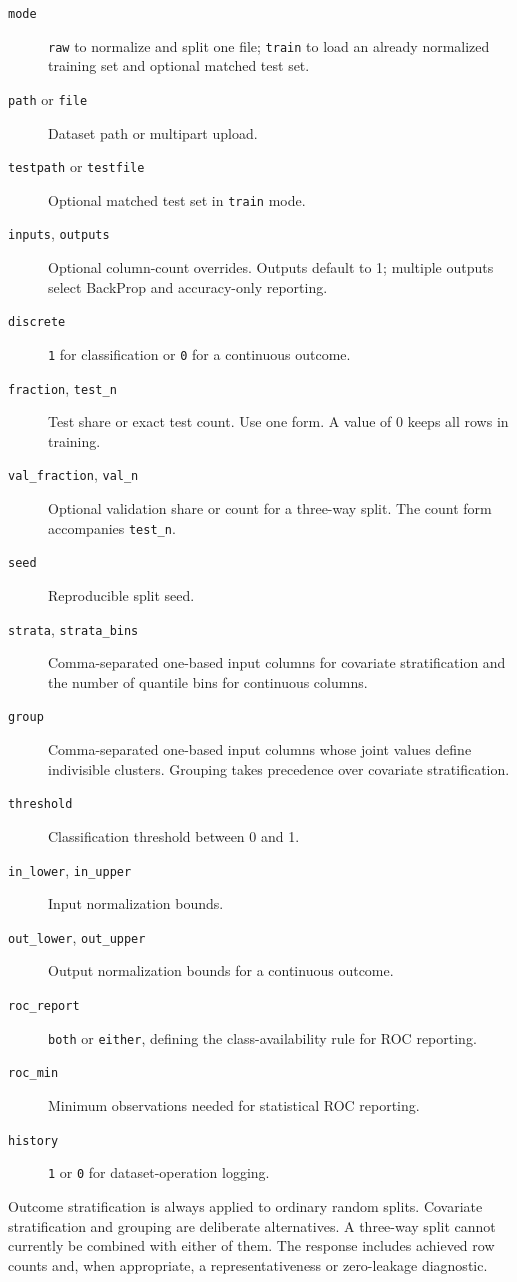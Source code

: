 \begin{description}
\item[\texttt{mode}] \texttt{raw} to normalize and split one file;
\texttt{train} to load an already normalized training set and optional
matched test set.
\item[\texttt{path} or \texttt{file}] Dataset path or multipart upload.
\item[\texttt{testpath} or \texttt{testfile}] Optional matched test set
in \texttt{train} mode.
\item[\texttt{inputs}, \texttt{outputs}] Optional column-count
overrides.  Outputs default to 1; multiple outputs select BackProp and
accuracy-only reporting.
\item[\texttt{discrete}] \texttt{1} for classification or \texttt{0}
for a continuous outcome.
\item[\texttt{fraction}, \texttt{test\_n}] Test share or exact test
count.  Use one form.  A value of 0 keeps all rows in training.
\item[\texttt{val\_fraction}, \texttt{val\_n}] Optional validation
share or count for a three-way split.  The count form accompanies
\texttt{test\_n}.
\item[\texttt{seed}] Reproducible split seed.
\item[\texttt{strata}, \texttt{strata\_bins}] Comma-separated
one-based input columns for covariate stratification and the number of
quantile bins for continuous columns.
\item[\texttt{group}] Comma-separated one-based input columns whose
joint values define indivisible clusters.  Grouping takes precedence
over covariate stratification.
\item[\texttt{threshold}] Classification threshold between 0 and 1.
\item[\texttt{in\_lower}, \texttt{in\_upper}] Input normalization
bounds.
\item[\texttt{out\_lower}, \texttt{out\_upper}] Output normalization
bounds for a continuous outcome.
\item[\texttt{roc\_report}] \texttt{both} or \texttt{either}, defining
the class-availability rule for ROC reporting.
\item[\texttt{roc\_min}] Minimum observations needed for statistical
ROC reporting.
\item[\texttt{history}] \texttt{1} or \texttt{0} for dataset-operation
logging.
\end{description}

Outcome stratification is always applied to ordinary random splits.
Covariate stratification and grouping are deliberate alternatives.
A three-way split cannot currently be combined with either of them.
The response includes achieved row counts and, when appropriate, a
representativeness or zero-leakage diagnostic.

